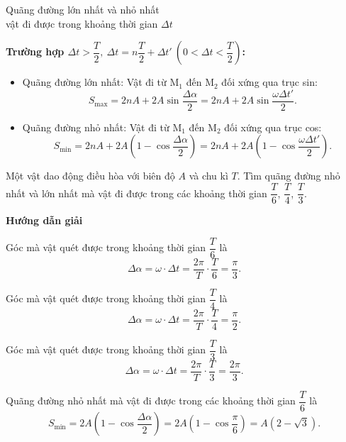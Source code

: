 \begin{dang}{Quãng đường lớn nhất và nhỏ nhất\\ vật đi được trong khoảng thời gian $\Delta t$}
{		\textbf{Trường hợp $\Delta t>\dfrac{T}{2},\ \Delta t=n\dfrac{T}{2}+\Delta t'\ \left( 0<\Delta t<\dfrac{T}{2}\right)$:}
		\begin{itemize}
			\item Quãng đường lớn nhất: Vật đi từ $\text{M}_1$ đến $\text{M}_2$ đối xứng qua trục sin:
			\begin{equation*}
				S_\text{max}=2nA+2A\sin\dfrac{\Delta \alpha}{2}=2nA+2A\sin\dfrac{\omega\Delta t'}{2}.
			\end{equation*}
			\item Quãng đường nhỏ nhất: Vật đi từ $\text{M}_1$ đến $\text{M}_2$ đối xứng qua trục cos:
			\begin{equation*}
				S_\text{min}=2nA+2A\left(1-\cos\dfrac{\Delta \alpha}{2}\right) =2nA+2A\left(1-\cos\dfrac{\omega\Delta t'}{2}\right).
			\end{equation*}
		\end{itemize}
	}
	{
		Một vật dao động điều hòa với biên độ $A$ và chu kì $T$. Tìm quãng đường nhỏ nhất và lớn nhất mà vật đi được trong các khoảng thời gian $\dfrac{T}{6}$, $\dfrac{T}{4}$, $\dfrac{T}{3}$.
	}
	{\begin{center}
			\textbf{Hướng dẫn giải}
		\end{center}
		
		Góc mà vật quét được trong khoảng thời gian $\dfrac{T}{6}$ là
		\begin{equation*}
			\Delta\alpha=\omega\cdot\Delta t=\dfrac{2\pi}{T}\cdot\dfrac{T}{6}=\dfrac{\pi}{3}.
		\end{equation*}
		
		Góc mà vật quét được trong khoảng thời gian $\dfrac{T}{4}$ là
		\begin{equation*}
			\Delta\alpha=\omega\cdot\Delta t=\dfrac{2\pi}{T}\cdot\dfrac{T}{4}=\dfrac{\pi}{2}.
		\end{equation*}
		
		Góc mà vật quét được trong khoảng thời gian $\dfrac{T}{3}$ là
		\begin{equation*}
			\Delta\alpha=\omega\cdot\Delta t=\dfrac{2\pi}{T}\cdot\dfrac{T}{3}=\dfrac{2\pi}{3}.
		\end{equation*}
		
		Quãng đường nhỏ nhất mà vật đi được trong các khoảng thời gian $\dfrac{T}{6}$ là 
		\begin{equation*}
			S_\text{min}=2A\left(1-\cos\dfrac{\Delta \alpha}{2}\right)=2A\left(1-\cos\dfrac{\pi}{6}\right)=A(2-\sqrt{3}).
		\end{equation*}
		
}
\end{dang}
